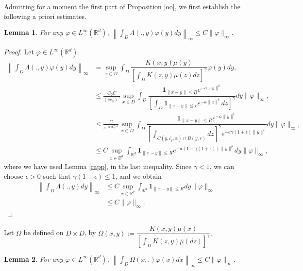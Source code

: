 \documentclass[notitlepage,reqno,11pt]{amsart}
\numberwithin{equation}{section}
\newtheorem{lemma}{Lemma}[section]
\def\R{\mathbb{R}}
\begin{document}
Admitting for a moment the first part of Proposition \ref{oo}, we first establish the following a priori estimates.
\begin{lemma}
	\label{lem1}
For any $\varphi \in L^{\infty} (\mathbb{R}^d)$,  $\left \|\displaystyle \int_{D} \Lambda(.,y)\varphi(y)dy\right \|_{\infty}\leq C\|\varphi\|_{\infty}.$
\end{lemma}
\begin{proof} Let $\varphi \in L^{\infty} (\mathbb{R}^d)$.
\begin{align*}
\left\|\displaystyle \int_{D} \Lambda(.,y)\varphi(y)dy\right \|_{\infty}&=\sup_{x\in D}\int_{D} \dfrac{K(x,y)\overline{\mu}(y)}{\left[\displaystyle\int_{D}K(z,y)\overline{\mu}(z)dz\right]^{\gamma}}\varphi(y)dy,\\
&\leq\frac{C_0 C}{(\underline{c}c_0)^\gamma}\sup_{x\in D}\int_{D}  \dfrac{\mathbf{1}_{\|x-y\|\leq \underline{R}}e^{-a\|y\|^{\delta}}}{\left[\displaystyle\int_{D} \mathbf{1}_{\|z-y\|\leq r}e^{-a\|z\|^{\delta}}dz\right]^{\gamma}}dy\|\varphi\|_{\infty},\\
&\leq \frac{C}{e^{-a\gamma C_\epsilon r^{\delta}}}\sup_{x\in D}\int_{D}  \dfrac{\mathbf{1}_{\|x-y\|\leq \underline{R}}e^{-a\|y\|^{\delta}}}{\left[\displaystyle\int_{C(y,l_y,\alpha)\cap B(y,r)}dz\right]^{\gamma}e^{-a\gamma (1+\epsilon)\|y\|^{\delta}}}dy\|\varphi\|_{\infty},\\
&\leq C\sup_{x\in \R^d}\int_{\R^d} \mathbf{1}_{\|x-y\|\leq \underline{R}}e^{-a(1-\gamma (1+\epsilon))\|y\|^{\delta}}dy\|\varphi\|_{\infty},
\end{align*}
where we have used Lemma \ref{rapp}, in the last inequality.
Since $\gamma <1$, we can choose $\epsilon>0$ such that $\gamma(1+\epsilon) \leq 1$, and we obtain
\begin{align*}
\left\|\displaystyle \int_{D} \Lambda(.,y)dy\right \|_{\infty}&\leq C \sup_{x\in \R^d}\int_{\R^d} \mathbf{1}_{\|x-y\|\leq \underline{R}}dy \|\varphi\|_{\infty}\\
&\leq C\|\varphi\|_{\infty}.
\end{align*}
\end{proof}
Let $\Omega$ be defined on $D\times D$,  by $
\Omega(x,y):=\dfrac{K(x,y)\overline{\mu}(x)}{\left[\displaystyle\int_{D}K(z,y)\overline{\mu}(dz) \right]^{\gamma}}.$
\begin{lemma}
	\label{lem2}
	For any $\varphi \in L^{\infty} (\mathbb{R}^d)$, $\left\|\displaystyle \int_{D} \Omega(x,.)\varphi(x)dx\right\|_{\infty}\leq C\|\varphi\|_{\infty}.$
\end{lemma}
\end{document}
